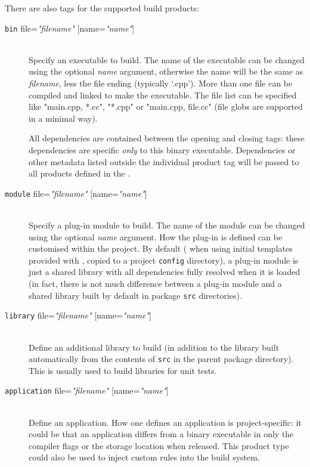 \ni There are also tags for the supported build products:
\begin{description}

\item[\lbkt\texttt{bin} file=\textit{"filename"} {[}name=\textit{"name"}{]}\rbkt{}]\mbox{}\\
  Specify an executable to build. The name of the executable can be
  changed using the optional \textit{name} argument, otherwise the
  name will be the same as \textit{filename}, less the file ending
  (typically `.cpp'). More than one file can be compiled and linked to
  make the executable. The file list can be specified like "main.cpp,
  *.cc", "*.cpp" or "main.cpp, file.cc" (\ie file globs are
  supported in a minimal way). 
  
  All dependencies are contained between the opening and closing tags:
  these dependencies are specific \textit{only} to this binary
  executable. Dependencies or other metadata listed outside the
  individual product tag will be passed to all products defined in the
  \buildfile.
  
\item[\lbkt\texttt{module} file=\textit{"filename"} {[}name=\textit{"name"}{]}\rbkt{}]\mbox{}\\
  Specify a plug-in module to build. The name of the module can be
  changed using the optional \textit{name} argument. How the plug-in
  is defined can be customised within the project. By default (\ie
  when using initial templates provided with \scram, copied to a
  project \texttt{config} directory), a plug-in module is just a shared
  library with all dependencies fully resolved when it is loaded (in
  fact, there is not much difference between a plug-in module and a
  shared library built by default in package \texttt{src} directories).
  
\item[\lbkt\texttt{library} file=\textit{"filename"} {[}name=\textit{"name"}{]}\rbkt{}]\mbox{}\\
  Define an additional library to build (in addition to the library
  built automatically from the contents of \texttt{src} in the parent
  package directory). This is usually used to build libraries for unit tests.

\item[\lbkt\texttt{application} file=\textit{"filename"} {[}name=\textit{"name"}{]}\rbkt{}]\mbox{}\\
  Define an application. How one defines an application is
  project-specific: it could be that an application differs from a
  binary executable in only the compiler flags or the storage
  location when released. This product type could also be used to
  inject custom rules into the build system.


\end{description}
